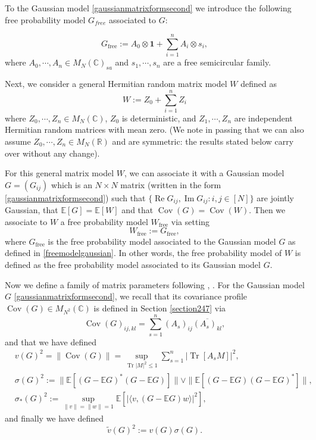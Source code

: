 \documentclass[11pt,reqno]{amsart}
\theoremstyle{plain}
\theoremstyle{remark}
\numberwithin{equation}{section}
\begin{document}
To the Gaussian model \eqref{gaussianmatrixformsecond}
we introduce the following free probability model $G_{free}$ associated to $G$:

\begin{equation}\label{freemodelgaussian}
G_{\text{free}}:=A_0\otimes \mathbf{1}+\sum_{i=1}^n A_i\otimes s_i,
\end{equation}where $A_0,\cdots,A_n\in M_N(\mathbb{C})_{sa}$ and $s_1,\cdots,s_n$ are a free semicircular family. 




Next, we consider a general Hermitian random matrix model $W$ defined as
\begin{equation}\label{generalmodels}
W:=Z_0+\sum_{i=1}^n Z_i
\end{equation} where $Z_0,\cdots,Z_n\in M_N(\mathbb{C})$, $Z_0$ is deterministic, and $Z_1,\cdots,Z_n$ are independent Hermitian random matrices with mean zero. (We note in passing that we can also assume $Z_0,\cdots,Z_n\in M_N(\mathbb{R})$ and are symmetric: the results stated below carry over without any change).

For this general matrix model $W$, we can associate it with a Gaussian model $G=(G_{ij})$ which is an $N\times N$ matrix (written in the form \eqref{gaussianmatrixformsecond}) such that $\{\operatorname{Re}G_{ij},\operatorname{Im}G_{ij}:i,j\in[N]\}$ are jointly Gaussian, that $\mathbb{E}[G]=\mathbb{E}[W]$ and that $\operatorname{Cov}(G)=\operatorname{Cov}(W)$. Then we associate to $W$ a free probability model $W_{\text{free}}$ via setting $$W_{\text{free}}:=G_{\text{free}},$$ where $G_{\text{free}}$ is the free probability model associated to the Gaussian model $G$ as defined in \eqref{freemodelgaussian}. In other words, the free probability model of $W$ is defined as the free probability model associated to its Gaussian model $G$. 

Now we define a family of matrix parameters following \cite{bandeira2023matrix}, \cite{brailovskaya2022universality}. For the Gaussian model $G$ \eqref{gaussianmatrixformsecond}, we recall that its covariance profile $\operatorname{Cov}(G)\in M_{N^2}(\mathbb{C})$ is defined in Section \ref{section247} via 
$$
\operatorname{Cov}(G)_{ij,kl}=\sum_{s=1}^n (A_s)_{ij}\overline{(A_s)_{kl}}, 
$$ and that we have defined 
$$\begin{aligned}
&v(G)^2=\|\operatorname{Cov}(G)\|=\sup_{\operatorname{Tr}|M|^2\leq 1}\sum_{s=1}^n |\operatorname{Tr}[A_sM]|^2,\\
&\sigma(G)^2:=\|\mathbb{E}[(G-\mathbb{E}G)^*(G-\mathbb{E}G)]\|\vee\|\mathbb{E}[(G-\mathbb{E}G)(G-\mathbb{E}G)^*]\|,\\
&\sigma_*(G)^2:=\sup_{\|v\|=\|w\|=1}\mathbb{E}[|\langle v,(G-\mathbb{E}G)w\rangle|^2],
\end{aligned}$$
and finally we have defined $$\tilde{v}(G)^2:=v(G)\sigma(G).$$
\end{document}
